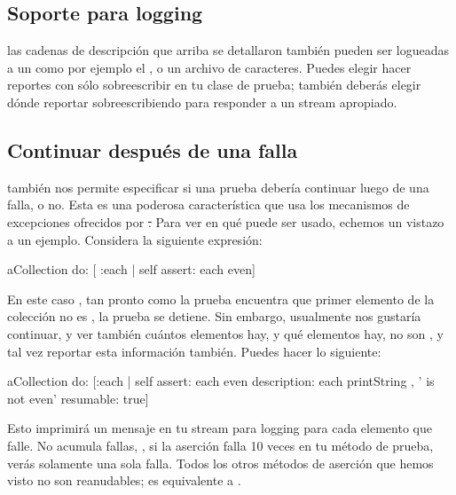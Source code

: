 \documentclass[a4paper,10pt,twoside]{book}
\begin{document}
\subsection{Soporte para logging}
las cadenas de descripci\'on que arriba se detallaron tambi\'en pueden ser logueadas a un 
 como por ejemplo el , o un archivo de caracteres.
Puedes elegir hacer reportes con s\'olo sobreescribir  en tu clase de prueba; tambi\'en deber\'as elegir d\'onde reportar sobreescribiendo   para
responder a un stream apropiado.

\subsection{Continuar despu\'es de una falla}

\sunit tambi\'en nos permite especificar si una prueba deber\'ia continuar luego de una falla, o no. 
Esta es una poderosa caracter\'istica que usa los mecanismos de excepciones ofrecidos por \st.
Para ver en qu\'e puede ser usado, echemos un vistazo a un ejemplo. Considera la siguiente expresi\'on:

\begin{code}{}
aCollection do: [ :each | self assert: each even]
\end{code}

En este caso , tan pronto como la prueba encuentra que primer elemento de la colecci\'on no es , la prueba se detiene.
Sin embargo, usualmente nos gustar\'ia continuar, y ver tambi\'en cu\'antos elementos hay, y qu\'e elementos hay,
no son , y tal vez reportar esta informaci\'on tambi\'en. Puedes hacer lo siguiente:

\begin{code}{}
aCollection do:
	[:each |
	self
		assert: each even
		description: each printString , ' is not even'
		resumable: true]
\end{code}

Esto imprimir\'a un mensaje en tu stream para logging para cada elemento que falle.
No acumula fallas, \ie, si la aserci\'on falla 10 veces en tu m\'etodo de prueba, ver\'as solamente una sola falla.
Todos los otros m\'etodos de aserci\'on que hemos visto no son reanudables;
 es equivalente a .
\end{document}
